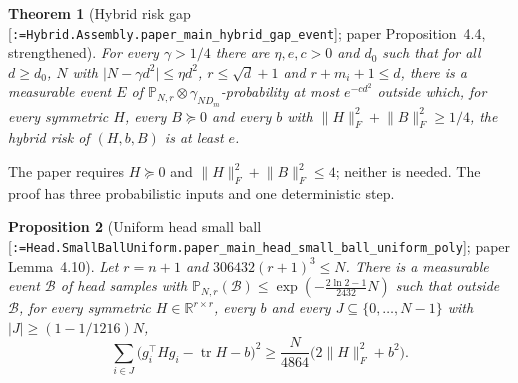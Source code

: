 \documentclass[11pt]{article}
\makeatletter
\newcommand{\formal@break}[1]{\@tfor\formal@tok:=#1\do{%
  \formal@tok
  \expandafter\ifx\formal@tok.\allowbreak\else
  \expandafter\ifx\formal@tok\_\allowbreak\fi\fi}}
\DeclareRobustCommand{\formal}[1]{\textnormal{[\texttt{\small\formal@break{#1}}]}}
\newcommand{\R}{\mathbb{R}}
\newcommand{\Prob}{\mathbb{P}}
\newcommand{\norm}[1]{\lVert #1\rVert}
\newcommand{\abs}[1]{\lvert #1\rvert}
\newcommand{\tr}{\operatorname{tr}}
\newcommand{\Fro}{F}
\newcommand{\sqd}{\sqrt{d}}
\newcommand{\gauss}{\gamma}
\newcommand{\Dd}{D}
\theoremstyle{plain}
\newtheorem{theorem}{Theorem}[section]
\newtheorem{proposition}[theorem]{Proposition}
\theoremstyle{definition}
\makeatother
\begin{document}
\begin{theorem}[Hybrid risk gap \formal{Hybrid.Assembly.paper\_main\_hybrid\_gap\_event}; paper Proposition~4.4, strengthened]\label{thm:hybrid}
For every $\gamma > 1/4$ there are $\eta, e, c > 0$ and $d_0$ such that for
all $d \ge d_0$, $N$ with $\abs{N - \gamma d^2} \le \eta d^2$, $r \le \sqd + 1$
and $r + m_i + 1 \le d$, there is a measurable event $E$ of
$\Prob_{N,r}\otimes\gauss_{N\Dd_m}$-probability at most $e^{-cd^2}$ outside
which, for every symmetric $H$, every $B \succeq 0$ and every $b$ with
$\norm{H}_\Fro^2 + \norm{B}_\Fro^2 \ge 1/4$, the hybrid risk of $(H, b, B)$ is
at least $e$.
\end{theorem}

The paper requires $H \succeq 0$ and $\norm{H}_\Fro^2 + \norm{B}_\Fro^2 \le 4$;
neither is needed. The proof has three probabilistic inputs and one
deterministic step.

\begin{proposition}[Uniform head small ball \formal{Head.SmallBallUniform.paper\_main\_head\_small\_ball\_uniform\_poly}; paper Lemma~4.10]\label{prop:smallball}
Let $r = n + 1$ and $306432(r+1)^3 \le N$. There is a measurable event
$\mathcal{B}$ of head samples with $\Prob_{N,r}(\mathcal{B}) \le \exp(-\frac{2\ln2 - 1}{2432}N)$
such that outside $\mathcal{B}$, for every symmetric $H \in \R^{r\times r}$,
every $b$ and every $J \subseteq \{0,\dots,N-1\}$ with $\abs{J} \ge (1 - 1/1216)N$,
\[
\sum_{i\in J}\bigl(g_i^{\top}Hg_i - \tr H - b\bigr)^2 \ge \frac{N}{4864}\bigl(2\norm{H}_\Fro^2 + b^2\bigr).
\]
\end{proposition}
\end{document}
